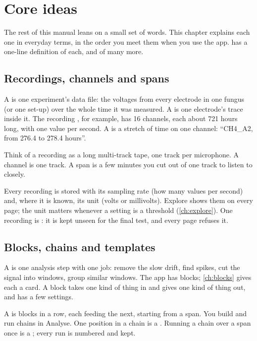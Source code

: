 \chapter{Core ideas}\label{ch:core-ideas}
The rest of this manual leans on a small set of words. This chapter explains each one in
everyday terms, in the order you meet them when you use the app.  has a
one-line definition of each, and of many more.

\section{Recordings, channels and spans}\label{sec:core-ideas-recordings}
A  is one experiment's data file: the voltages from every
electrode in one fungus (or one set-up) over the whole time it was measured. A
 is one electrode's trace inside it. The recording
, for example, has 16 channels, each about 721 hours long, with one
value per second. A  is a stretch of time on one channel: ``CH4\_A2, from
276.4 to 278.4 hours''.

\begin{plainterms}
Think of a recording as a long multi-track tape, one track per microphone. A channel is one
track. A span is a few minutes you cut out of one track to listen to closely.
\end{plainterms}

Every recording is stored with its sampling rate (how many values per second) and, where it
is known, its unit (volts or millivolts). Explore shows them on every page; the unit matters
whenever a setting is a threshold (\cref{ch:explore}). One recording is : it is kept unseen for the final test, and every page refuses it.

\section{Blocks, chains and templates}\label{sec:core-ideas-blocks}
A  is one analysis step with one job: remove the slow drift, find
spikes, cut the signal into windows, group similar windows. The app has \ubnumblocks{}
blocks; \cref{ch:blocks} gives each a card. A block takes one kind of thing in and gives one
kind of thing out, and has a few settings.

A  is blocks in a row, each feeding the next, starting from a span. You
build and run chains in Analyse. One position in a chain is a . Running a
chain over a span once is a ; every run is numbered and kept.

